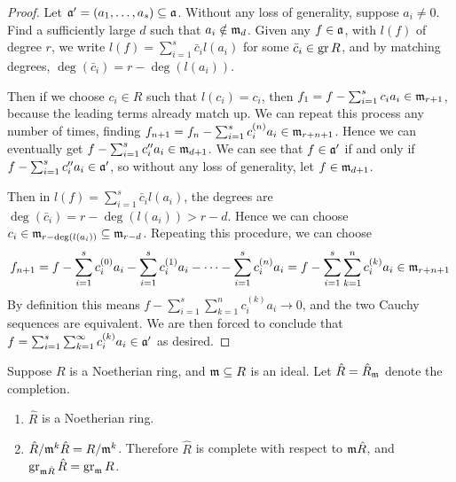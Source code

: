 \begin{proof}
    Let \(\mathfrak{a}' = (a_1,\hdots,a_s) \subseteq \mathfrak{a}\).
    Without any loss of generality, suppose \(a_i \neq 0\).
    Find a sufficiently large \(d\) such that \(a_i \notin \mathfrak{m}_d\).
    Given any \(f \in \mathfrak{a}\), with \(l(f)\) of degree \(r\),
    we write \(l(f) = \sum_{i=1}^s \bar{c}_i l(a_i)\) for some \(\bar{c}_i \in \operatorname{gr} R\),
    and by matching degrees, \(\deg(\bar{c}_i) = r - \deg(l(a_i))\).

    Then if we choose \(c_i \in R\) such that \(l(c_i) = c_i\),
    then \(f_1 = f - \sum_{i=1}^s c_i a_i \in \mathfrak{m}_{r+1}\), because the leading terms already match up.
    We can repeat this process any number of times,
    finding \(f_{n+1} = f_n - \sum_{i=1}^s c_i^{(n)} a_i \in \mathfrak{m}_{r+n+1}\).
    Hence we can eventually get \(f - \sum_{i=1}^s c''_i a_i \in \mathfrak{m}_{d+1}\).
    We can see that \(f \in \mathfrak{a}'\) if and only if \(f - \sum_{i=1}^s c''_i a_i \in \mathfrak{a}'\),
    so without any loss of generality, let \(f \in \mathfrak{m}_{d+1}\).

    Then in \(l(f) = \sum_{i=1}^s \bar{c}_i l(a_i)\),
    the degrees are \(\deg(\bar{c}_i) = r - \deg(l(a_i)) > r-d\).
    Hence we can choose \(c_i \in \mathfrak{m}_{r-\deg(l(a_i))} \subseteq \mathfrak{m}_{r-d}\).
    Repeating this procedure, we can choose
    \begin{equation*}
        f_{n+1} = f - \sum_{i=1}^s c_i^{(0)} a_i - \sum_{i=1}^s c_i^{(1)} a_i - \cdots - \sum_{i=1}^s c_i^{(n)} a_i
        = f - \sum_{i=1}^s \sum_{k=1}^n c_i^{(k)} a_i \in \mathfrak{m}_{r+n+1}
    \end{equation*}
    By definition this means \(f - \sum_{i=1}^s \sum_{k=1}^n c_i^{(k)} a_i \to 0\),
    and the two Cauchy sequences are equivalent.
    We are then forced to conclude that \(f = \sum_{i=1}^s \sum_{k=1}^\infty c_i^{(k)} a_i \in \mathfrak{a}'\) as desired.
\end{proof}
\begin{theorem}\label{thm:completion-noetherian}
    Suppose \(R\) is a Noetherian ring, and \(\mathfrak{m} \subseteq R\) is an ideal.
    Let \(\hat{R} = \hat{R}_{\mathfrak{m}}\) denote the completion.
    \begin{enumerate}[label={(\alph*)}, itemsep=0mm]
        \item \(\hat{R}\) is a Noetherian ring.
        \item \(\hat{R}/\mathfrak{m}^k\hat{R} = R/\mathfrak{m}^k\).
        Therefore \(\hat{R}\) is complete with respect to \(\mathfrak{m}\hat{R}\),
        and \(\operatorname{gr}_{\mathfrak{m}\hat{R}} \hat{R} = \operatorname{gr}_{\mathfrak{m}} R\).
    \end{enumerate}
\end{theorem}
